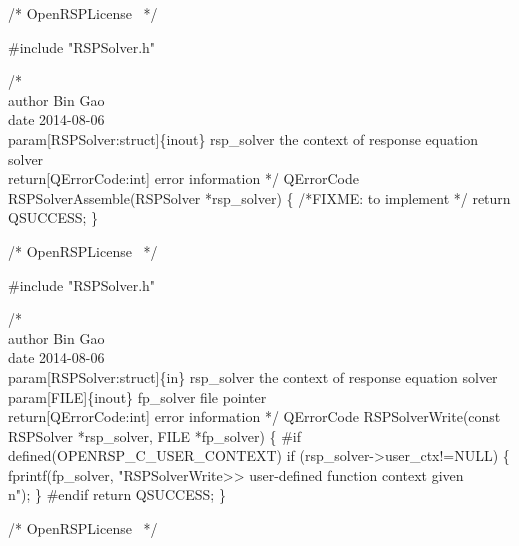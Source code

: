 \nwendcode{}\endmoddef
/*
  \LA{}OpenRSPLicense~{\nwtagstyle{}}\RA{}
*/

#include "RSPSolver.h"

/*%
    \\author Bin Gao
    \\date 2014-08-06
    \\param[RSPSolver:struct]\{inout\} rsp_solver the context of response equation solver
    \\return[QErrorCode:int] error information
*/
QErrorCode RSPSolverAssemble(RSPSolver *rsp_solver)
\{
/*FIXME: to implement */
    return QSUCCESS;
\}

\nwendcode{}\endmoddef
/*
  \LA{}OpenRSPLicense~{\nwtagstyle{}}\RA{}
*/

#include "RSPSolver.h"

/*%
    \\author Bin Gao
    \\date 2014-08-06
    \\param[RSPSolver:struct]\{in\} rsp_solver the context of response equation solver
    \\param[FILE]\{inout\} fp_solver file pointer
    \\return[QErrorCode:int] error information
*/
QErrorCode RSPSolverWrite(const RSPSolver *rsp_solver, FILE *fp_solver)
\{
#if defined(OPENRSP_C_USER_CONTEXT)
    if (rsp_solver->user_ctx!=NULL) \{
        fprintf(fp_solver, "RSPSolverWrite>> user-defined function context given\\n");
    \}
#endif
    return QSUCCESS;
\}

\nwendcode{}\endmoddef
/*
  \LA{}OpenRSPLicense~{\nwtagstyle{}}\RA{}
*/

